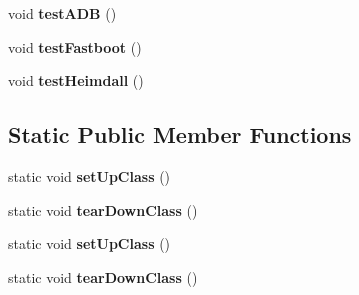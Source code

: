 \begin{DoxyCompactItemize}
\item 
\hypertarget{class_c_a_s_u_a_l_1_1language_1_1_c_a_s_u_a_l_language_test_aa2542c1a32f34345a25c6bb5084ffeb3}{void {\bfseries test\-A\-D\-B} ()}\label{class_c_a_s_u_a_l_1_1language_1_1_c_a_s_u_a_l_language_test_aa2542c1a32f34345a25c6bb5084ffeb3}

\item 
\hypertarget{class_c_a_s_u_a_l_1_1language_1_1_c_a_s_u_a_l_language_test_a2fc229da2a8b15682f30d07384faa74f}{void {\bfseries test\-Fastboot} ()}\label{class_c_a_s_u_a_l_1_1language_1_1_c_a_s_u_a_l_language_test_a2fc229da2a8b15682f30d07384faa74f}

\item 
\hypertarget{class_c_a_s_u_a_l_1_1language_1_1_c_a_s_u_a_l_language_test_aa924a82a43bd2a051c9a12e16a8533f1}{void {\bfseries test\-Heimdall} ()}\label{class_c_a_s_u_a_l_1_1language_1_1_c_a_s_u_a_l_language_test_aa924a82a43bd2a051c9a12e16a8533f1}

\end{DoxyCompactItemize}
\subsection*{Static Public Member Functions}
\begin{DoxyCompactItemize}
\item 
\hypertarget{class_c_a_s_u_a_l_1_1language_1_1_c_a_s_u_a_l_language_test_abcd5c876f245ffbcb4ee6a0c84ec43fc}{static void {\bfseries set\-Up\-Class} ()}\label{class_c_a_s_u_a_l_1_1language_1_1_c_a_s_u_a_l_language_test_abcd5c876f245ffbcb4ee6a0c84ec43fc}

\item 
\hypertarget{class_c_a_s_u_a_l_1_1language_1_1_c_a_s_u_a_l_language_test_ad9a943087ad2dac9ff10883b78cd5a5a}{static void {\bfseries tear\-Down\-Class} ()}\label{class_c_a_s_u_a_l_1_1language_1_1_c_a_s_u_a_l_language_test_ad9a943087ad2dac9ff10883b78cd5a5a}

\item 
\hypertarget{class_c_a_s_u_a_l_1_1language_1_1_c_a_s_u_a_l_language_test_abcd5c876f245ffbcb4ee6a0c84ec43fc}{static void {\bfseries set\-Up\-Class} ()}\label{class_c_a_s_u_a_l_1_1language_1_1_c_a_s_u_a_l_language_test_abcd5c876f245ffbcb4ee6a0c84ec43fc}

\item 
\hypertarget{class_c_a_s_u_a_l_1_1language_1_1_c_a_s_u_a_l_language_test_ad9a943087ad2dac9ff10883b78cd5a5a}{static void {\bfseries tear\-Down\-Class} ()}\label{class_c_a_s_u_a_l_1_1language_1_1_c_a_s_u_a_l_language_test_ad9a943087ad2dac9ff10883b78cd5a5a}

\end{DoxyCompactItemize}


